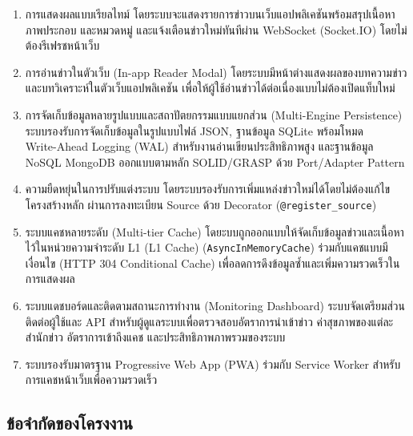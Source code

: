 \begin{enumerate}
    \item การแสดงผลแบบเรียลไทม์ โดยระบบจะแสดงรายการข่าวบนเว็บแอปพลิเคชันพร้อมสรุปเนื้อหา ภาพประกอบ และหมวดหมู่ และแจ้งเตือนข่าวใหม่ทันทีผ่าน WebSocket (Socket.IO) โดยไม่ต้องรีเฟรชหน้าเว็บ
    \item การอ่านข่าวในตัวเว็บ (In-app Reader Modal) โดยระบบมีหน้าต่างแสดงผลของบทความข่าวและบทวิเคราะห์ในตัวเว็บแอปพลิเคชัน เพื่อให้ผู้ใช้อ่านข่าวได้ต่อเนื่องแบบไม่ต้องเปิดแท็บใหม่
    \item การจัดเก็บข้อมูลหลายรูปแบบและสถาปัตยกรรมแบบแยกส่วน (Multi-Engine Persistence) ระบบรองรับการจัดเก็บข้อมูลในรูปแบบไฟล์ JSON, ฐานข้อมูล SQLite พร้อมโหมด \\Write-Ahead Logging (WAL) สำหรับงานอ่านเขียนประสิทธิภาพสูง และฐานข้อมูล NoSQL MongoDB ออกแบบตามหลัก SOLID/GRASP ด้วย Port/Adapter Pattern
    \item ความยืดหยุ่นในการปรับแต่งระบบ โดยระบบรองรับการเพิ่มแหล่งข่าวใหม่ได้โดยไม่ต้องแก้ไขโครงสร้างหลัก ผ่านการลงทะเบียน Source ด้วย Decorator (\texttt{@register\_source})
    \item ระบบแคชหลายระดับ (Multi-tier Cache) โดยะบบถูกออกแบบให้จัดเก็บข้อมูลข่าวและเนื้อหาไว้ในหน่วยความจำระดับ L1 (L1 Cache) (\texttt{AsyncInMemoryCache}) ร่วมกับแคชแบบมีเงื่อนไข (HTTP 304 Conditional Cache) เพื่อลดการดึงข้อมูลซ้ำและเพิ่มความรวดเร็วในการแสดงผล
    \item ระบบแดชบอร์ดและติดตามสถานะการทำงาน (Monitoring Dashboard) ระบบจัดเตรียมส่วนติดต่อผู้ใช้และ API สำหรับผู้ดูแลระบบเพื่อตรวจสอบอัตราการนำเข้าข่าว ค่าสุขภาพของแต่ละสำนักข่าว อัตราการเข้าถึงแคช และประสิทธิภาพภาพรวมของระบบ
    \item  ระบบรองรับมาตรฐาน Progressive Web App (PWA) ร่วมกับ Service Worker สำหรับการแคชหน้าเว็บเพื่อความรวดเร็ว
\end{enumerate}

\subsection{ข้อจำกัดของโครงงาน}

